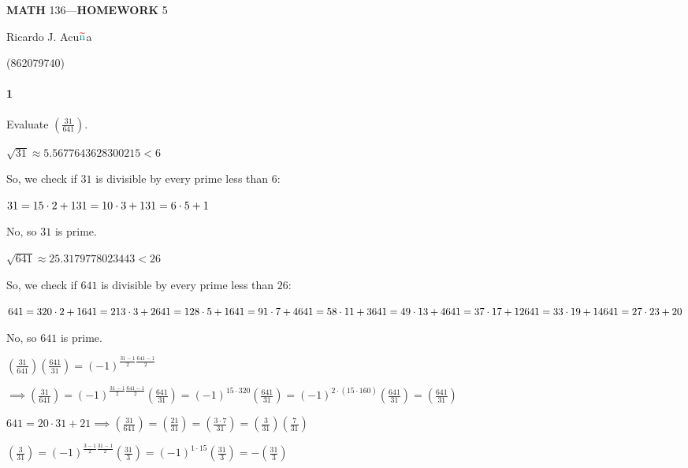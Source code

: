\documentclass{article}
\begin{document}
\begin{center}
  \textbf{MATH} 136---\textbf{HOMEWORK} 5

  \color{red}R\color{teal}icardo
  \color{red}J\color{cyan}.
  \color{red}A\color{teal}cu$\color{red}{\widetilde{\color{teal}\text{n}}}$\color{teal}a\color{black}

  \color{teal} (\color{red}862079740\color{teal})\color{black}
\end{center}\vspace{1.618em}

\paragraph{1} Evaluate $(\frac{31}{641})$.

$\sqrt{31}\approx 5.5677643628300215 < 6$

So, we check if $31$ is divisible by every prime less than $6$:

$31 = 15\cdot 2 + 1\\
31 = 10\cdot 3 + 1\\
31 = 6\cdot 5 + 1$

No, so $31$ is prime.

$\sqrt{641} \approx 25.3179778023443 < 26$

So, we check if $641$ is divisible by every prime less than $26$:

$641 = 320\cdot2 + 1\\
641 = 213\cdot3 + 2\\
641 = 128\cdot5 + 1\\
641 = 91\cdot7 + 4\\
641 = 58\cdot11 + 3\\
641 = 49\cdot13 + 4\\
641 = 37\cdot17 + 12\\
641 = 33\cdot19 + 14\\
641 = 27\cdot23 + 20$

No, so $641$ is prime.

$(\frac{31}{641})(\frac{641}{31})=
(-1)^{\frac{31-1}{2}\frac{641-1}{2}}$

$\implies (\frac{31}{641})= (-1)^{\frac{31-1}{2}\frac{641-1}{2}}
(\frac{641}{31}) = (-1)^{15\cdot 320} (\frac{641}{31}) = (-1)^{2\cdot(15\cdot 160)}
(\frac{641}{31}) = (\frac{641}{31})$

$641 = 20\cdot 31 + 21 \implies (\frac{31}{641}) = (\frac{21}{31}) =
(\frac{3\cdot 7}{31}) = (\frac{3}{31}) (\frac{7}{31}) $

$(\frac{3}{31})  = (-1)^{\frac{3-1}{2}\frac{31-1}{2}}(\frac{31}{3}) =
(-1)^{1\cdot 15} (\frac{31}{3}) = -(\frac{31}{3})$
\end{document}
